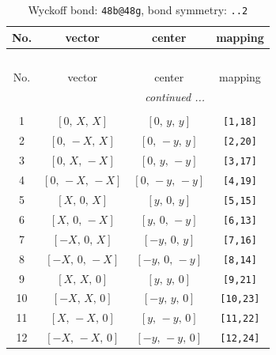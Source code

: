 \documentclass[fleqn,8pt]{jsarticle}
\begin{document}
\begin{longtable}{cccc}
\caption{Wyckoff bond: {\tt 48b@48g}, bond symmetry: {\tt ..2}}
 \\
 \hline \hline
No. & vector & center & mapping \\ \hline \endfirsthead

\multicolumn{3}{l}{\tablename\ \thetable{}} \\
 \hline \hline
No. & vector & center & mapping \\ \hline \endhead

 \hline \hline
\multicolumn{3}{r}{\footnotesize\it continued ...} \\ \endfoot

 \hline \hline
\multicolumn{3}{r}{} \\ \endlastfoot

1 & $\left[ 0,\, X,\, X \right]$ & $\left[ 0,\, y,\, y \right]$ & {\tt [1,18]} \\ \hline
2 & $\left[ 0,\, - X,\, X \right]$ & $\left[ 0,\, - y,\, y \right]$ & {\tt [2,20]} \\ \hline
3 & $\left[ 0,\, X,\, - X \right]$ & $\left[ 0,\, y,\, - y \right]$ & {\tt [3,17]} \\ \hline
4 & $\left[ 0,\, - X,\, - X \right]$ & $\left[ 0,\, - y,\, - y \right]$ & {\tt [4,19]} \\ \hline
5 & $\left[ X,\, 0,\, X \right]$ & $\left[ y,\, 0,\, y \right]$ & {\tt [5,15]} \\ \hline
6 & $\left[ X,\, 0,\, - X \right]$ & $\left[ y,\, 0,\, - y \right]$ & {\tt [6,13]} \\ \hline
7 & $\left[ - X,\, 0,\, X \right]$ & $\left[ - y,\, 0,\, y \right]$ & {\tt [7,16]} \\ \hline
8 & $\left[ - X,\, 0,\, - X \right]$ & $\left[ - y,\, 0,\, - y \right]$ & {\tt [8,14]} \\ \hline
9 & $\left[ X,\, X,\, 0 \right]$ & $\left[ y,\, y,\, 0 \right]$ & {\tt [9,21]} \\ \hline
10 & $\left[ - X,\, X,\, 0 \right]$ & $\left[ - y,\, y,\, 0 \right]$ & {\tt [10,23]} \\ \hline
11 & $\left[ X,\, - X,\, 0 \right]$ & $\left[ y,\, - y,\, 0 \right]$ & {\tt [11,22]} \\ \hline
12 & $\left[ - X,\, - X,\, 0 \right]$ & $\left[ - y,\, - y,\, 0 \right]$ & {\tt [12,24]} \\
\end{longtable}
\renewcommand{\arraystretch}{1.2}
\end{document}
